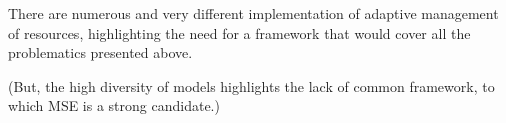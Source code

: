 \documentclass[12pt,a4paper]{article}
\begin{document}
There are numerous and very different implementation of adaptive management of resources, highlighting the need for a framework that would cover all the problematics presented above. 


(But, the high diversity of models highlights the lack of common framework, to which MSE is a strong candidate.)

\end{document}
